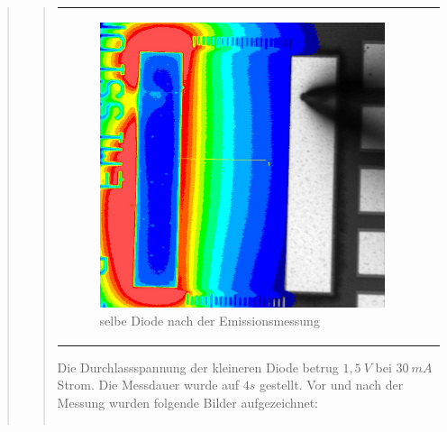\begin{quote}
\begin{quote}
\begin{center}
\begin{tabular}{ll}
\begin{minipage}{0.6\textwidth}
                         \begin{figure}[H]
                            \label{fig:bvxcvx}
                            \includegraphics[scale=0.25, trim = 0cm 0cm 0cm
                            0cm,
                            clip]{./Emissionsbilder/drei/nach_Emissionsmessung_Distanz.jpg}
                            \caption{selbe Diode nach der Emissionsmessung}
                        \end{figure}
                   \vspace{-1.5em}

                    \end{minipage}

                \end{tabular}
                \end{center}

        \vspace{2em}

        Die Durchlassspannung der kleineren Diode betrug $1,5\ V$ bei $30\ mA$
        Strom. Die Messdauer wurde auf $4s$ gestellt. Vor und nach der Messung
        wurden folgende Bilder aufgezeichnet:


         \begin{center}
                \begin{tabular}{ll}


\end{tabular}
\end{center}
\end{quote}
\end{quote}
